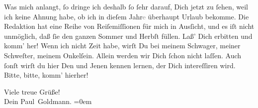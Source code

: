 \pstart
           Was mich anlangt,{ }ſo dringe ich deshalb{ }ſo{ }ſehr darauf, Dich jetzt zu{ }ſehen, weil ich
               keine Ahnung habe, ob ich in dieſem Jahr\textcolor{gray}{e} überhaupt Urlaub
               bekomme. Die Redaktion hat eine
               Reihe von Reiſemiſſionen für mich in Ausſicht, und es iſt nicht unmöglich, daß{ }ſie
               den ganzen Sommer und Herbſt füllen. Laß’ Dich erbitten und komm’ her! Wenn ich nicht
               Zeit habe, wirſt Du bei meinem Schwager, meiner Schweſter, meinem Onkelſein. Allein werden wir Dich{ }ſchon nicht laſſen. Auch{ }ſonſt wirſt du
               hier Den und Jenen kennen lernen, der Dich  intereſſiren wird. Bitte, bitte, komm’ hierher!\pend
           
\pstart
           Viele treue Grüße! {\\[\baselineskip]}Dein \spacefill\mbox{Paul Goldmann.}\pend
           \leftskip=0em{}\endnumbering{}  \newcommand{\dateiname}{L02873}\newcommand{\titel}{Paul Goldmann an Arthur Schnitzler, 29. 4. 1899}\newcommand{\editorInnen}{Martin Anton Müller und Laura Untner}
